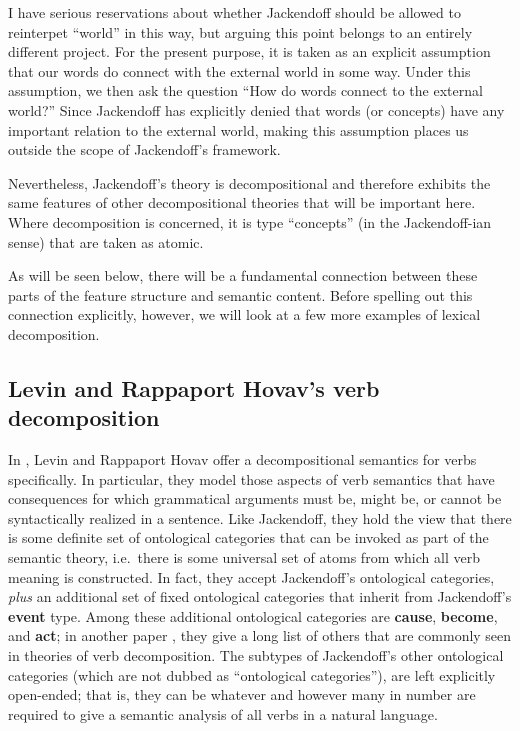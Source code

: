 I have serious reservations about whether Jackendoff should be allowed to reinterpet ``world'' in this way, but arguing this point belongs to an entirely different project. For the present purpose, it is taken as an explicit assumption that our words do connect with the external world in some way. Under this assumption, we then ask the question ``How do words connect to the external world?'' Since Jackendoff has explicitly denied that words (or concepts) have any important relation to the external world, making this assumption places us outside the scope of Jackendoff's framework.

Nevertheless, Jackendoff's theory is decompositional and therefore exhibits the same features of other decompositional theories that will be important here. Where decomposition is concerned, it is type ``concepts'' (in the Jackendoff-ian sense) that are taken as atomic.  

As will be seen below, there will be a fundamental connection between these parts of the feature structure and semantic content. Before spelling out this connection explicitly, however, we will look at a few more examples of lexical decomposition.

\subsection{Levin and Rappaport Hovav's verb decomposition}

In \cite{levin_building_1998}, Levin and Rappaport Hovav offer a decompositional semantics for verbs specifically. In particular, they model those aspects of verb semantics that have consequences for which grammatical arguments must be, might be, or cannot be syntactically realized in a sentence. Like Jackendoff, they hold the view that there is some definite set of ontological categories that can be invoked as part of the semantic theory, i.e.\ there is some universal set of atoms from which all verb meaning is constructed. In fact, they accept Jackendoff's ontological categories, \emph{plus} an additional set of fixed ontological categories that inherit from Jackendoff's {\bf event} type. Among these additional ontological categories are {\bf cause}, {\bf become}, and {\bf act}; in another paper \cite{levin_lexical_2008}, they give a long list of others that are commonly seen in theories of verb decomposition. The subtypes of Jackendoff's other ontological categories (which are not dubbed as ``ontological categories''), are left explicitly open-ended; that is, they can be whatever and however many in number are required to give a semantic analysis of all verbs in a natural language.

